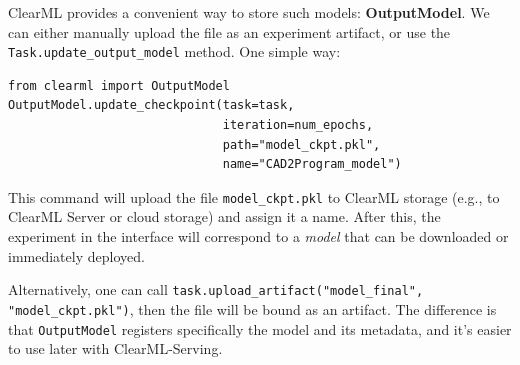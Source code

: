\documentclass{article}
\begin{document}
ClearML provides a convenient way to store such models: \textbf{OutputModel}. We can either manually upload the file as an experiment artifact, or use the \texttt{Task.update_output_model} method. One simple way:
\begin{lstlisting}
from clearml import OutputModel
OutputModel.update_checkpoint(task=task,
                              iteration=num_epochs,
                              path="model_ckpt.pkl",
                              name="CAD2Program_model")
\end{lstlisting}
This command will upload the file \texttt{model_ckpt.pkl} to ClearML storage (e.g., to ClearML Server or cloud storage) and assign it a name. After this, the experiment in the interface will correspond to a \emph{model} that can be downloaded or immediately deployed.

Alternatively, one can call \texttt{task.upload_artifact("model_final", "model_ckpt.pkl")}, then the file will be bound as an artifact. The difference is that \texttt{OutputModel} registers specifically the model and its metadata, and it's easier to use later with ClearML-Serving.
\end{document}
